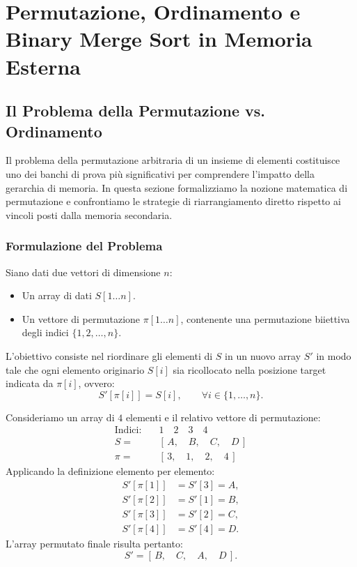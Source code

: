 \chapter{Permutazione, Ordinamento e Binary Merge Sort in Memoria Esterna}
\label{cha:lecture-three}

\FloatBarrier
\section{Il Problema della Permutazione vs. Ordinamento}
\label{sec:permutation-vs-sorting}

Il problema della permutazione arbitraria di un insieme di elementi costituisce uno dei banchi di prova pi\`u significativi per comprendere l'impatto della gerarchia di memoria. In questa sezione formalizziamo la nozione matematica di permutazione e confrontiamo le strategie di riarrangiamento diretto rispetto ai vincoli posti dalla memoria secondaria.

\FloatBarrier
\subsection{Formulazione del Problema}
\label{subsec:problem-formulation}

Siano dati due vettori di dimensione $n$:
\begin{itemize}
  \item Un array di dati $S[1 \dots n]$.
  \item Un vettore di permutazione $\pi[1 \dots n]$, contenente una permutazione biiettiva degli indici $\{1, 2, \dots, n\}$.
\end{itemize}

L'obiettivo consiste nel riordinare gli elementi di $S$ in un nuovo array $S'$ in modo tale che ogni elemento originario $S[i]$ sia ricollocato nella posizione target indicata da $\pi[i]$, ovvero:
\begin{equation}
  S'[\pi[i]] = S[i], \qquad \forall i \in \{1, \dots, n\}.
\end{equation}

\begin{example}
\label{ex:permutation-def}
Consideriamo un array di $4$ elementi e il relativo vettore di permutazione:
\begin{align*}
  \text{Indici:} \quad & 1 \quad 2 \quad 3 \quad 4 \\
  S = \quad & [\, A, \quad B, \quad C, \quad D \,] \\
  \pi = \quad & [\, 3, \quad 1, \quad 2, \quad 4 \,]
\end{align*}
Applicando la definizione elemento per elemento:
\begin{align*}
  S'[\pi[1]] &= S'[3] = A, \\
  S'[\pi[2]] &= S'[1] = B, \\
  S'[\pi[3]] &= S'[2] = C, \\
  S'[\pi[4]] &= S'[4] = D.
\end{align*}
L'array permutato finale risulta pertanto:
\[
  S' = [\, B, \quad C, \quad A, \quad D \,].
\]
\end{example}

